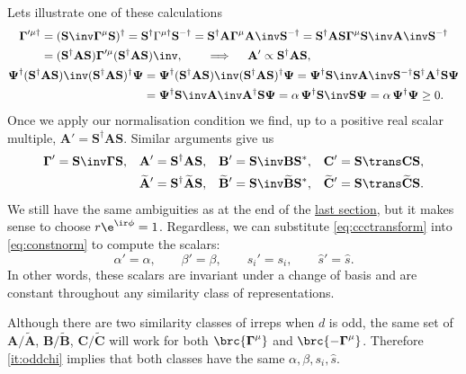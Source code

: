 \documentclass[11pt]{article}
\newcommand{\invd}{^{-\dag}}
\newcommand{\Gammab}{\boldsymbol{\Gamma}}
\newcommand{\mud}{{\mu\dag}}
\renewcommand{\S}{\mathbf{S}}
\newcommand{\A}{\mathbf{A}}
\newcommand{\B}{\mathbf{B}}
\renewcommand{\C}{\mathbf{C}}
\newcommand{\At}{\widetilde{\A}}
\newcommand{\Bt}{\widetilde{\B}}
\newcommand{\Ct}{\widetilde{\C}}
\newcommand{\Psib}{\boldsymbol{\Psi}}
\begin{document}
Lets illustrate one of these calculations
%
\begin{equation*}
\begin{gathered}
\begin{aligned}
  \Gammab'^\mud
    &= (\S\inv \Gammab^\mu \S)^\dag
    = \S^\dag \Gamma^\mud \S\invd
    = \S^\dag \A \Gammab^\mu \A\inv \S\invd
    = \S^\dag \A \S \Gammab^\mu \S\inv \A\inv \S\invd \\
    &= (\S^\dag \A \S) \Gammab'^\mu (\S^\dag \A \S)\inv,
    \qquad \implies \quad
    \A' \propto \S^\dag \A \S,
\end{aligned}
\\
\begin{aligned}
  \Psib^\dag (\S^\dag \A \S)\inv (\S^\dag \A \S)^\dag \Psib
    &= \Psib^\dag (\S^\dag \A \S)\inv (\S^\dag \A \S)^\dag \Psib
     = \Psib^\dag \S\inv \A\inv \S\invd \S^\dag \A^\dag \S \Psib \\
    &= \Psib^\dag \S\inv \A\inv \A^\dag \S \Psib
     = \alpha\, \Psib^\dag \S\inv \S \Psib
     = \alpha\, \Psib^\dag \Psib
     \geq 0.
\end{aligned}
\end{gathered}
\end{equation*}
%
Once we apply our normalisation condition we find, up to a positive real scalar multiple,
\( \A' = \S^\dag \A \S \).
Similar arguments give us
%
\begin{equation}\label{eq:ccctransform}
\begin{aligned}
  \Gammab' &= \S\inv \Gammab \S, &
  \A' &= \S^\dag \A \S, &
  \B' &= \S\inv \B \S^\ast, &
  \C' &= \S\trans \C \S,
\\ &&
  \At' &= \S^\dag \At \S, &
  \Bt' &= \S\inv \Bt \S^\ast, &
  \Ct' &= \S\trans \Ct \S.
\end{aligned}
\end{equation}
%
We still have the same ambiguities as at the end of the \hyperref[eq:constnorm]{last section}, but it makes sense to choose \( r \e^{\ir\phi} = 1 \).
Regardless, we can substitute \cref{eq:ccctransform} into \cref{eq:constnorm} to compute the scalars:
%
\begin{equation*}
  \alpha' = \alpha, \qquad
  \beta' = \beta, \qquad
  s_i' = s_i, \qquad
  \hat{s}' = \hat{s}.
\end{equation*}
%
In other words, these scalars are invariant under a change of basis and are constant throughout any similarity class of representations.

Although there are two similarity classes of irreps when $d$ is odd, the same set of $\A/\At$, $\B/\Bt$, $\C/\Ct$ will work for both $\brc{\Gammab^\mu}$ and $\brc{ -\Gammab^\mu }$.
Therefore \cref{it:oddchi} implies that both classes have the same $\alpha, \beta, s_i, \hat{s}$.
\end{document}

